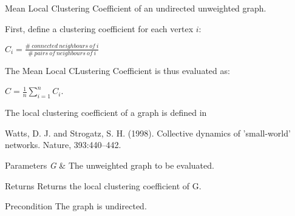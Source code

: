 Mean Local Clustering Coefficient of an undirected unweighted graph. 

First, define a clustering coefficient for each vertex $i$\+:

$C_i = \frac{\# \ connected \ neighbours \ of \ i}{\# \ pairs \ of \ neighbours \ of \ i}$

The Mean Local C\+Lustering Coefficient is thus evaluated as\+:

$C = \frac{1}{n} \sum_{i=1}^n C_i$.

The local clustering coefficient of a graph is defined in \begin{DoxyVerb}Watts, D. J. and Strogatz, S. H. (1998). Collective
dynamics of ’small-world’ networks. Nature, 393:440–442.
\end{DoxyVerb}



\begin{DoxyParams}{Parameters}
{\em G} & The unweighted graph to be evaluated. \\
\hline
\end{DoxyParams}
\begin{DoxyReturn}{Returns}
Returns the local clustering coefficient of G. 
\end{DoxyReturn}
\begin{DoxyPrecond}{Precondition}
The graph is undirected. 
\end{DoxyPrecond}
